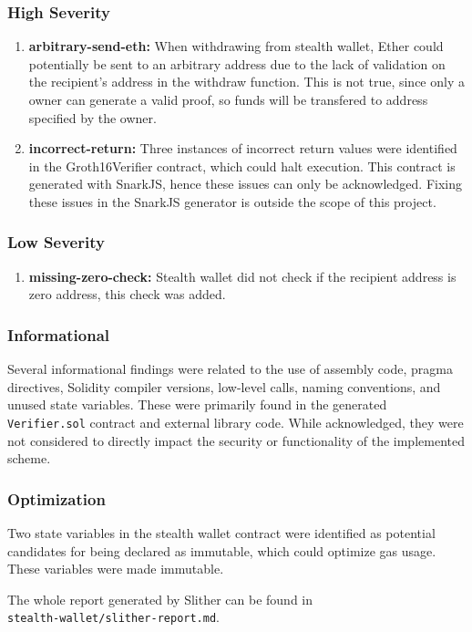 \subsubsection*{High Severity}
\begin{enumerate}
    \item \textbf{arbitrary-send-eth:} When withdrawing from stealth wallet, Ether
        could potentially be sent to an arbitrary address due to the lack of
        validation on the recipient's address in the withdraw function. This is
        not true, since only a owner can generate a valid proof, so funds
        will be transfered to address specified by the owner.
    \item \textbf{incorrect-return:} Three instances of incorrect return
        values were identified in the Groth16Verifier contract, which could halt
        execution. This contract is generated with SnarkJS, hence these issues
        can only be acknowledged. Fixing these issues in the SnarkJS generator
        is outside the scope of this project.
\end{enumerate}

\subsubsection*{Low Severity}
\begin{enumerate}
    \item \textbf{missing-zero-check: } Stealth wallet did not check if the
        recipient address is zero address, this check was added.
\end{enumerate}

\subsubsection*{Informational}
Several informational findings were related to the use of assembly code,
pragma directives, Solidity compiler versions, low-level calls, naming
conventions, and unused state variables. These were primarily found in the
generated \texttt{Verifier.sol} contract and external library code. While acknowledged,
they were not considered to directly impact the security or functionality of
the implemented scheme.

\subsubsection*{Optimization}
Two state variables in the stealth wallet contract were identified as potential
candidates for being declared as immutable, which could optimize gas usage.
These variables were made immutable.

The whole report generated by Slither can be found in\\\texttt{stealth-wallet/slither-report.md}.
